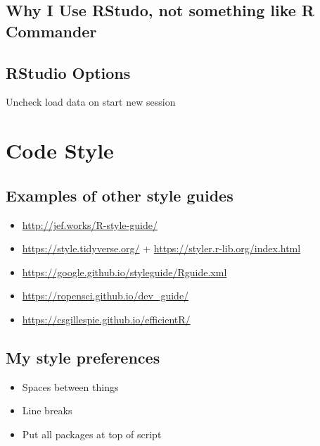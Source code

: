 \documentclass[]{book}
\providecommand{\tightlist}{%
  \setlength{\itemsep}{0pt}\setlength{\parskip}{0pt}}
\begin{document}
\hypertarget{why-i-use-rstudo-not-something-like-r-commander}{%
\subsection{Why I Use RStudo, not something like R Commander}\label{why-i-use-rstudo-not-something-like-r-commander}}

\hypertarget{rstudio-options}{%
\subsection{RStudio Options}\label{rstudio-options}}

Uncheck load data on start new session

\hypertarget{code-style}{%
\section{Code Style}\label{code-style}}

\hypertarget{examples-of-other-style-guides}{%
\subsection{Examples of other style guides}\label{examples-of-other-style-guides}}

\begin{itemize}
\tightlist
\item
  \url{http://jef.works/R-style-guide/}
\item
  \url{https://style.tidyverse.org/} + \url{https://styler.r-lib.org/index.html}
\item
  \url{https://google.github.io/styleguide/Rguide.xml}
\item
  \url{https://ropensci.github.io/dev_guide/}
\item
  \url{https://csgillespie.github.io/efficientR/}
\end{itemize}

\hypertarget{my-style-preferences}{%
\subsection{My style preferences}\label{my-style-preferences}}

\begin{itemize}
\tightlist
\item
  Spaces between things
\item
  Line breaks
\item
  Put all packages at top of script
\end{itemize}
\end{document}

